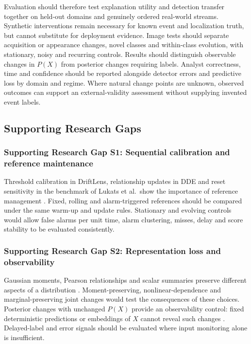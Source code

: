 \documentclass[10pt,a4paper]{article}
\begin{document}
Evaluation should therefore test explanation utility and detection transfer together on held-out domains and genuinely ordered real-world streams. Synthetic interventions remain necessary for known event and localization truth, but cannot substitute for deployment evidence. Image tests should separate acquisition or appearance changes, novel classes and within-class evolution, with stationary, noisy and recurring controls. Results should distinguish observable changes in $P(X)$ from posterior changes requiring labels. Analyst correctness, time and confidence should be reported alongside detector errors and predictive loss by domain and regime. Where natural change points are unknown, observed outcomes can support an external-validity assessment without supplying invented event labels.

\subsection{Supporting Research Gaps}
\subsubsection*{Supporting Research Gap S1: Sequential calibration and reference maintenance}
Threshold calibration in DriftLens, relationship updates in DDE and reset sensitivity in the benchmark of Lukats et al.\ show the importance of reference management \cite{greco,szucs,lukats}. Fixed, rolling and alarm-triggered references should be compared under the same warm-up and update rules. Stationary and evolving controls would allow false alarms per unit time, alarm clustering, misses, delay and score stability to be evaluated consistently.

\subsubsection*{Supporting Research Gap S2: Representation loss and observability}
Gaussian moments, Pearson relationships and scalar summaries preserve different aspects of a distribution \cite{greco,szucs,assis}. Moment-preserving, nonlinear-dependence and marginal-preserving joint changes would test the consequences of these choices. Posterior changes with unchanged $P(X)$ provide an observability control: fixed deterministic predictions or embeddings of $X$ cannot reveal such changes \cite{driftvis}. Delayed-label and error signals should be evaluated where input monitoring alone is insufficient.
\end{document}
